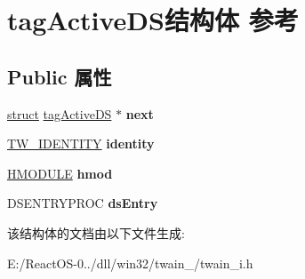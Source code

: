 \hypertarget{structtag_active_d_s}{}\section{tag\+Active\+D\+S结构体 参考}
\label{structtag_active_d_s}
\subsection*{Public 属性}
\begin{DoxyCompactItemize}
\item 
\mbox{\label{structtag_active_d_s_a2ea582a90513201fd91e8458e297506c}} 
\hyperlink{interfacestruct}{struct} \hyperlink{structtag_active_d_s}{tag\+Active\+DS} $\ast$ {\bfseries next}
\item 
\mbox{\label{structtag_active_d_s_a5987fa8dc42f4eeaf9c411788d9ab86e}} 
\hyperlink{struct_t_w___i_d_e_n_t_i_t_y}{T\+W\+\_\+\+I\+D\+E\+N\+T\+I\+TY} {\bfseries identity}
\item 
\mbox{\label{structtag_active_d_s_a99a1ce75aed3f9f331aa966ad5a5db07}} 
\hyperlink{interfacevoid}{H\+M\+O\+D\+U\+LE} {\bfseries hmod}
\item 
\mbox{\label{structtag_active_d_s_a22b1f09ad89b35c0852e4ffacd6bbd50}} 
D\+S\+E\+N\+T\+R\+Y\+P\+R\+OC {\bfseries ds\+Entry}
\end{DoxyCompactItemize}


该结构体的文档由以下文件生成\+:\begin{DoxyCompactItemize}
\item 
E\+:/\+React\+O\+S-\/0../dll/win32/twain\+\_/twain\+\_\+i.\+h\end{DoxyCompactItemize}
